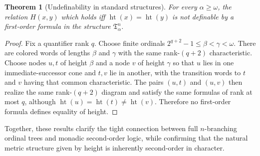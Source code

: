 \documentclass{amsart}
\newtheorem{theorem}{Theorem}
\theoremstyle{definition}
\begin{document}
\begin{theorem}[Undefinability in standard structures]\label{thm:height-not-definable-structure}
    For every $\alpha\ge\omega$, the relation $H(x,y)$ which holds iff $\operatorname{ht}(x)=\operatorname{ht}(y)$ is not definable by a first‑order formula in the structure $\mathfrak{T}_\alpha^n$.
\end{theorem}
\begin{proof}

  Fix a quantifier rank $q$. Choose finite ordinals $2^{q+2}-1\leq\beta<\gamma<\omega$. There are colored words of lengths $\beta$ and $\gamma$ with the same rank-$(q+2)$ characteristic. Choose nodes $u,t$ of height $\beta$ and a node $v$ of height $\gamma$ so that $u$ lies in one immediate-successor cone and $t,v$ lie in another, with the transition words to $t$ and $v$ having that common characteristic. The pairs $(u,t)$ and $(u,v)$ then realize the same rank-$(q+2)$ diagram and satisfy the same formulas of rank at most $q$, although $\operatorname{ht}(u)=\operatorname{ht}(t)\neq\operatorname{ht}(v)$. Therefore no first-order formula defines equality of height.


\end{proof}

Together, these results clarify the tight connection between full $n$-branching ordinal trees and monadic second‑order logic, while confirming that the natural metric structure given by height is inherently second‑order in character.

\printbibliography
\end{document}
